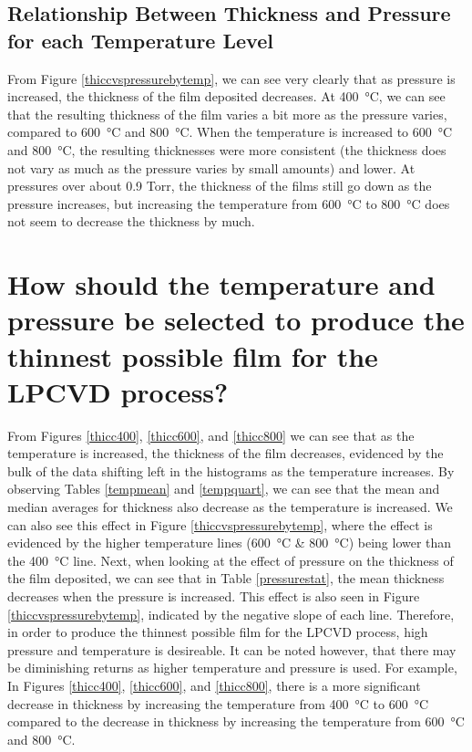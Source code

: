 \documentclass[letterpaper]{article}
\begin{document}
\subsection{Relationship Between Thickness and Pressure for each Temperature Level}

From Figure \ref{thiccvspressurebytemp}, we can see very clearly that as pressure
is increased, the thickness of the film deposited decreases. At \SI{400}{\celsius},
we can see that the resulting thickness of the film varies a bit more as the pressure
varies, compared to \SI{600}{\celsius} and \SI{800}{\celsius}. When the temperature is
increased to \SI{600}{\celsius} and \SI{800}{\celsius}, the resulting thicknesses were
more consistent (the thickness does not vary as much as the pressure varies by small amounts) and lower. At pressures over about 0.9 Torr, the thickness
of the films still go down as the pressure increases, but increasing the temperature from
\SI{600}{\celsius} to \SI{800}{\celsius} does not seem to decrease the thickness by much.

\section{How should the temperature and pressure be selected to produce the thinnest possible film for the LPCVD process?}

From Figures \ref{thicc400}, \ref{thicc600}, and \ref{thicc800} we can see that
as the temperature is increased, the thickness of the film decreases, evidenced
by the bulk of the data shifting left in the histograms as the temperature
increases. By observing Tables \ref{tempmean} and \ref{tempquart}, we can see
that the mean and median averages for thickness also decrease as the temperature
is increased. We can also see this effect in Figure \ref{thiccvspressurebytemp},
where the effect is evidenced by the higher temperature lines
(\SI{600}{\celsius} \& \SI{800}{\celsius}) being lower than the
\SI{400}{\celsius} line. Next, when looking at the effect of pressure on the
thickness of the film deposited, we can see that in Table \ref{pressurestat},
the mean thickness decreases when the pressure is increased. This effect is also
seen in Figure \ref{thiccvspressurebytemp}, indicated by the negative slope of
each line. Therefore, in order to produce the thinnest possible film for the
LPCVD process, high pressure and temperature is desireable. It can be noted
however, that there may be diminishing returns as higher temperature and
pressure is used. For example, In Figures \ref{thicc400}, \ref{thicc600}, and
\ref{thicc800}, there is a more significant decrease in thickness by increasing
the temperature from \SI{400}{\celsius} to \SI{600}{\celsius} compared to the
decrease in thickness by increasing the temperature from \SI{600}{\celsius}
and \SI{800}{\celsius}.
\end{document}
